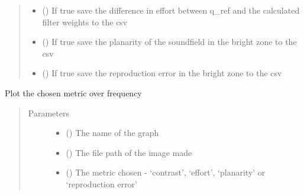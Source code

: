 \documentclass[letterpaper,10pt,english]{sphinxmanual}
\begin{document}
\begin{fulllineitems}
\begin{fulllineitems}
\begin{quote}
\begin{description}
\begin{itemize}
\item {} 
 () \textendash{} If true save the difference in effort between q\_ref and the calculated filter weights to the csv

\item {} 
 () \textendash{} If true save the planarity of the soundfield in the bright zone to the csv

\item {} 
 () \textendash{} If true save the reproduction error in the bright zone to the csv

\end{itemize}

\end{description}\end{quote}

\end{fulllineitems}


\begin{fulllineitems}
\label{\detokenize{source/pyzones:pyzones.Metrics.plot}}
Plot the chosen metric over frequency
\begin{quote}\begin{description}
\item[{Parameters}] \leavevmode\begin{itemize}
\item {} 
 () \textendash{} The name of the graph

\item {} 
 () \textendash{} The file path of the image made

\item {} 
 () \textendash{} The metric chosen - ‘contrast’, ‘effort’, ‘planarity’ or ‘reproduction error’


\end{itemize}
\end{description}
\end{quote}
\end{fulllineitems}
\end{fulllineitems}
\end{document}
